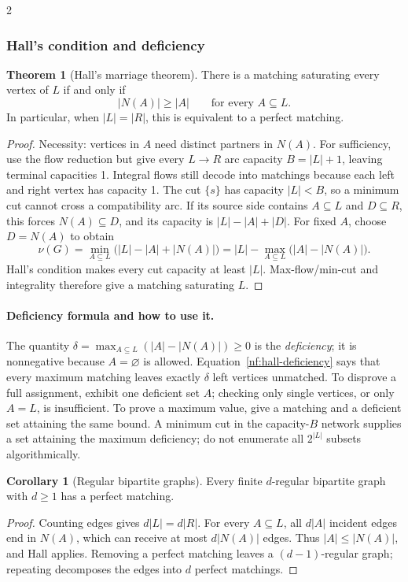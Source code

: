 \documentclass[10pt]{article}
\theoremstyle{definition}
\newtheorem{theorem}[definition]{Theorem}
\newtheorem{corollary}[definition]{Corollary}
\begin{document}
\begin{multicols*}{2}
\subsubsection*{Hall's condition and deficiency}
\begin{theorem}[Hall's marriage theorem]\label{nf:hall}
There is a matching saturating every vertex of $L$ if and only if
\[
 |N(A)|\ge |A|\qquad\text{for every }A\subseteq L.
\]
In particular, when $|L|=|R|$, this is equivalent to a perfect matching.
\end{theorem}
\begin{proof}
Necessity: vertices in $A$ need distinct partners in $N(A)$.
For sufficiency, use the flow reduction but give every $L\to R$ arc
capacity $B=|L|+1$, leaving terminal capacities 1. Integral flows still
decode into matchings because each left and right vertex has capacity 1.
The cut $\{s\}$ has capacity $|L|<B$, so a minimum cut cannot cross a
compatibility arc. If its source side contains $A\subseteq L$ and
$D\subseteq R$, this forces $N(A)\subseteq D$, and its capacity is
$|L|-|A|+|D|$. For fixed $A$, choose $D=N(A)$ to obtain
\begin{equation}\label{nf:hall-deficiency}
 \nu(G)=\min_{A\subseteq L}\bigl(|L|-|A|+|N(A)|\bigr)
       =|L|-\max_{A\subseteq L}\bigl(|A|-|N(A)|\bigr).
\end{equation}
Hall's condition makes every cut capacity at least $|L|$. Max-flow/min-cut
and integrality therefore give a matching saturating $L$.
\end{proof}
\paragraph{Deficiency formula and how to use it.}
The quantity $\delta=\max_{A\subseteq L}(|A|-|N(A)|)\ge0$ is the
\emph{deficiency}; it is nonnegative because $A=\varnothing$ is allowed.
Equation~\eqref{nf:hall-deficiency} says that every maximum matching leaves
exactly $\delta$ left vertices unmatched. To disprove a full assignment,
exhibit one deficient set $A$; checking only single vertices, or only
$A=L$, is insufficient. To prove a maximum value, give a matching and a
deficient set attaining the same bound. A minimum cut in the capacity-$B$
network supplies a set attaining the maximum deficiency; do not enumerate
all $2^{|L|}$ subsets algorithmically.

\begin{samepage}
\begin{corollary}[Regular bipartite graphs]
Every finite $d$-regular bipartite graph with $d\ge1$ has a perfect matching.
\end{corollary}
\begin{proof}
Counting edges gives $d|L|=d|R|$. For every $A\subseteq L$, all $d|A|$
incident edges end in $N(A)$, which can receive at most $d|N(A)|$ edges.
Thus $|A|\le|N(A)|$, and Hall applies. Removing a perfect matching leaves
a $(d-1)$-regular graph; repeating decomposes the edges into $d$ perfect
matchings.
\end{proof}
\end{samepage}


\end{multicols*}
\end{document}
